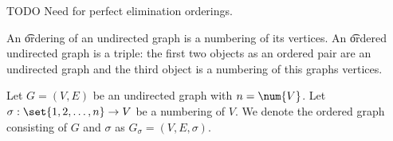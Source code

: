 

TODO
Need for perfect elimination orderings.


An \t{ordering} of an undirected graph is a numbering of its vertices.
An \t{ordered undirected graph} is a triple: the first two objects as an ordered pair are an undirected graph and the third object is a numbering of this graphs vertices.


Let $G = (V, E)$ be an undirected graph with $n = \num{V}$.
Let $\sigma: \set{1, 2, \dots, n} \to V$ be a numbering of $V$.
We denote the ordered graph consisting of $G$ and $\sigma$ as $G_{\sigma} = (V, E, \sigma)$.

